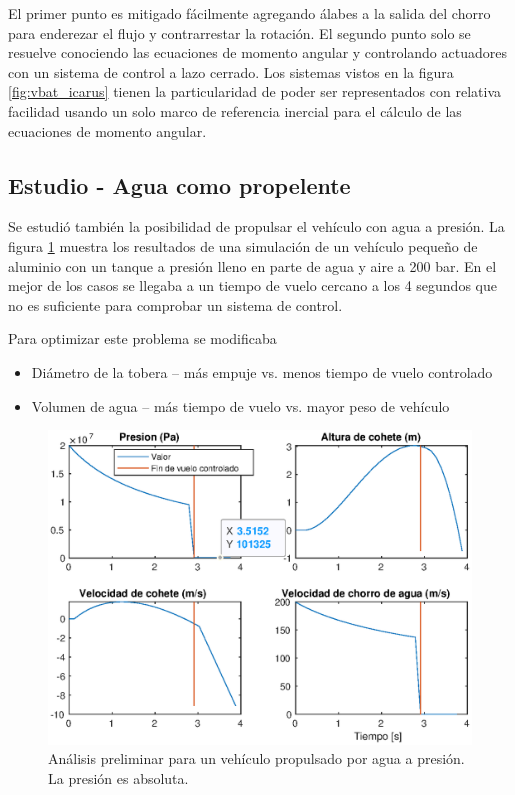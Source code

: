 El primer punto es mitigado fácilmente agregando álabes a la salida del chorro para enderezar el flujo y contrarrestar la rotación. El segundo punto solo se resuelve conociendo las ecuaciones de momento angular y controlando actuadores con un sistema de control a lazo cerrado. Los sistemas vistos en la figura \ref{fig:vbat_icarus} tienen la particularidad de poder ser representados con relativa facilidad usando un solo marco de referencia inercial para el cálculo de las ecuaciones de momento angular. 

\subsection{Estudio - Agua como propelente}
Se estudió también la posibilidad de propulsar el vehículo con agua a presión. La figura \ref{fig:bottlerocket} muestra los resultados de una simulación de un vehículo pequeño de aluminio con un tanque a presión lleno en parte de agua y aire a 200 bar. En el mejor de los casos se llegaba a un tiempo de vuelo cercano a los 4 segundos que no es suficiente para comprobar un sistema de control. 

Para optimizar este problema se modificaba

\begin{itemize}
    \item Diámetro de la tobera -- más empuje vs. menos tiempo de vuelo controlado
    \item Volumen de agua -- más tiempo de vuelo vs. mayor peso de vehículo
\end{itemize}


\begin{figure}[htb]
    \centering
    \includegraphics[width=0.8\linewidth]{fig/bottlerocket}
    \caption{Análisis preliminar para un vehículo propulsado por agua a presión. La presión es absoluta.}
    \label{fig:bottlerocket}
\end{figure}

\newpage



